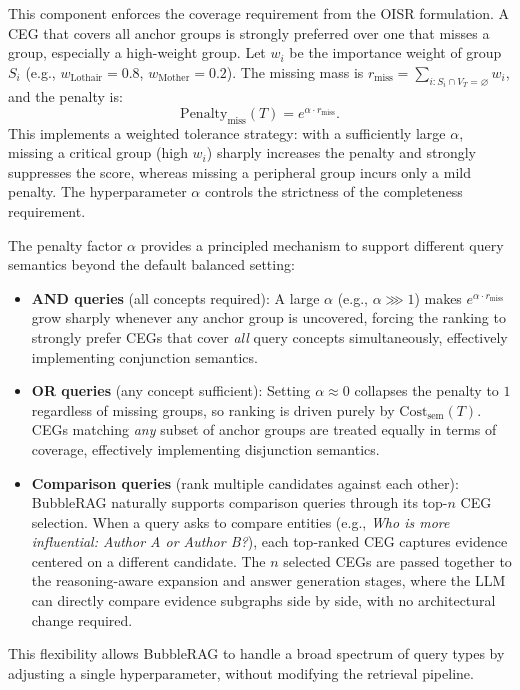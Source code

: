 This component enforces the coverage requirement from the OISR formulation. A CEG that covers all anchor groups is strongly preferred over one that misses a group, especially a high-weight group.
Let $w_i$ be the importance weight of group $S_i$ (e.g.,
$w_{\text{Lothair}}=0.8$, $w_{\text{Mother}}=0.2$). The missing mass is
$r_{\text{miss}}=\sum_{i: S_i \cap V_T = \varnothing} w_i$, and the penalty is:
\begin{equation}
\text{Penalty}_{\text{miss}}(T) = e^{\alpha \cdot r_{\text{miss}}}.
\label{eq:penalty}
\end{equation}
This implements a weighted tolerance strategy: with a sufficiently large
$\alpha$, missing a critical group (high $w_i$) sharply increases the penalty
and strongly suppresses the score, whereas missing a peripheral group incurs
only a mild penalty. The hyperparameter $\alpha$ controls the strictness of the completeness
requirement.

The penalty factor $\alpha$ provides a principled mechanism to support different query semantics beyond the default balanced setting:
\begin{itemize}[leftmargin=*, itemsep=0.3em, topsep=0.3em]
    \item \textbf{AND queries} (all concepts required): A large $\alpha$ (e.g., $\alpha \ggg 1$) makes $e^{\alpha \cdot r_{\text{miss}}}$ grow sharply whenever any anchor group is uncovered, forcing the ranking to strongly prefer CEGs that cover \emph{all} query concepts simultaneously, effectively implementing conjunction semantics.
    \item \textbf{OR queries} (any concept sufficient): Setting $\alpha \approx 0$ collapses the penalty to $1$ regardless of missing groups, so ranking is driven purely by $\text{Cost}_{\text{sem}}(T)$. CEGs matching \emph{any} subset of anchor groups are treated equally in terms of coverage, effectively implementing disjunction semantics.
    \item \textbf{Comparison queries} (rank multiple candidates against each other): BubbleRAG naturally supports comparison queries through its top-$n$ CEG selection. When a query asks to compare entities (e.g., \textit{Who is more influential: Author A or Author B?}), each top-ranked CEG captures evidence centered on a different candidate. The $n$ selected CEGs are passed together to the reasoning-aware expansion and answer generation stages, where the LLM can directly compare evidence subgraphs side by side, with no architectural change required.
\end{itemize}
This flexibility allows BubbleRAG to handle a broad spectrum of query types by adjusting a single hyperparameter, without modifying the retrieval pipeline.

